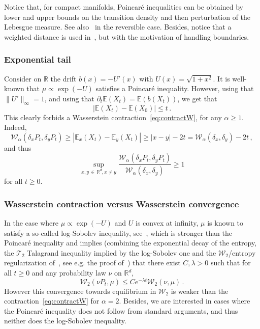 \documentclass[10pt]{amsart}
\theoremstyle{definition}\newtheorem{defi}[theo]{Definition}\newtheorem{rema}[theo]{Remark}\newtheorem{exam}[theo]{Example}\newtheorem{exem}[theo]{Example}\newtheorem{nota}[theo]{Notation}
\newcommand{\R}{\mathbb R}
\newcommand{\bbE}{\mathbb E}
\newcommand{\clW}{\mathcal W}
\newcommand{\clT}{\mathcal T}
\newcommand{\1}{\mathbbm{1}}
\newcommand{\nv}[1]{#1}
\begin{document}
Notice that, for compact manifolds, Poincaré inequalities can be obtained by lower and upper bounds on the transition density and then perturbation of the Lebesgue measure. See also~\cite{Wang2,Wang3} in the reversible case. Besides, notice that a weighted distance is used in~\cite{Wang3}, but with the motivation of handling boundaries.

\subsubsection*{Exponential tail}

Consider on $\R$ the drift $b(x) = - U'(x)$ with $U(x)=\sqrt{1+x^2}$. It is well-known that $\mu \propto \exp(-U)$ satisfies a Poincaré inequality. However, using that $\|U'\|_\infty = 1$, and using that $\partial_t \bbE (X_t) = \bbE(b(X_t))$, we get that
\[
\left|\bbE(X_t) - \bbE(X_0)\right| \leqslant t\,.
\]
This clearly forbids a Wasserstein contraction~\eqref{eq:contractW}, for any $\alpha\geqslant 1$. Indeed,
\[
\clW_\alpha\left(\delta_x P_t,\delta_y P_t\right) \geqslant \left|\bbE_x(X_t) - \bbE_y(X_t)\right| \geqslant |x-y| - 2t = \clW_\alpha\left(\delta_x,\delta_y\right)-2t\,,
\]
and thus
\[
\sup_{x,y\,\in\,\R^d,x\neq y} \frac{\clW_\alpha\left(\delta_x P_t,\delta_y P_t\right)}{\clW_\alpha(\delta_x,\delta_y)} \geqslant 1
\]
for all $t\geqslant 0$.

\subsubsection*{Wasserstein contraction versus Wasserstein convergence}



In the case where $\mu\propto \exp(-U)$ and $U$ is convex at infinity, $\mu$ is known to satisfy a so-called log-Sobolev inequality, see~\cite{BakryGentilLedoux}, which is stronger than the Poincaré inequality and implies (combining the exponential decay of the entropy, the $\clT_2$ Talagrand inequality implied by the log-Sobolev one and the $\clW_2$/entropy regularization of~\cite{RocknerWang}, see e.g. the proof of~\cite[Theorem~2]{MonmarcheGuillinVFP}) that there exist $C,\lambda>0$ such that for all $t\geqslant0$ and \nv{any} probability law $\nu$ on $\R^d$,
\[
\clW_2(\nu P_t,\mu) \leqslant C e^{-\lambda t} \clW_2(\nu,\mu)\,.
\]
However this convergence toward\nv{s} equilibrium in $\clW_2$ is weaker than the contraction~\eqref{eq:contractW} for $\alpha=2$. Besides, we are interested in cases where the Poincaré inequality does not follow from standard arguments, and thus neither does the log-Sobolev inequality.
\end{document}
